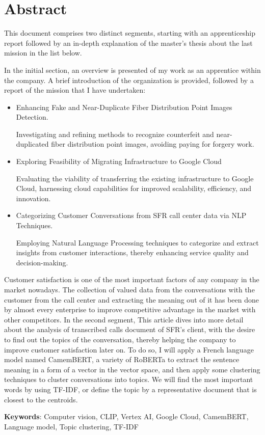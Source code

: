 \chapter*{Abstract}

This document comprises two distinct segments, starting with an apprenticeship report followed by an in-depth explanation of the master's thesis about the last mission in the list below.

In the initial section, an overview is presented of my work as an apprentice within the company. A brief introduction of the organization is provided, followed by a report of the mission that I have undertaken:

\begin{itemize}
    \item Enhancing Fake and Near-Duplicate Fiber Distribution Point Images Detection.

Investigating and refining methods to recognize counterfeit and near-duplicated fiber distribution point images, avoiding paying for forgery work.

    \item Exploring Feasibility of Migrating Infrastructure to Google Cloud

Evaluating the viability of transferring the existing infrastructure to Google Cloud, harnessing cloud capabilities for improved scalability, efficiency, and innovation.

    \item Categorizing Customer Conversations from SFR call center data via NLP Techniques.

Employing Natural Language Processing techniques to categorize and extract insights from customer interactions, thereby enhancing service quality and decision-making.

\end{itemize}

Customer satisfaction is one of the most important factors of any company in the market nowadays. The collection of valued data from the conversations with the customer from the call center and extracting the meaning out of it has been done by almost every enterprise to improve competitive advantage in the market with other competitors. In the second segment, This article dives into more detail about the analysis of transcribed calls document of SFR's client, with the desire to find out the topics of the conversation, thereby helping the company to improve customer satisfaction later on. To do so, I will apply a French language model named CamemBERT, a variety of RoBERTa to extract the sentence meaning in a form of a vector in the vector space, and then apply some clustering techniques to cluster conversations into topics. We will find the most important words by using TF-IDF, or define the topic by a representative document that is closest to the centroids.

\textbf{Keywords}: Computer vision, CLIP, Vertex AI, Google Cloud, CamemBERT, Language model, Topic clustering, TF-IDF
